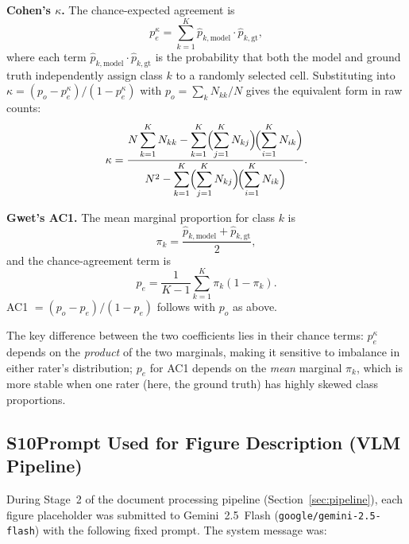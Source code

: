 \documentclass[../main.tex]{subfiles}
\begin{document}
\textbf{Cohen's $\kappa$.}
The chance-expected agreement is
\begin{equation*}
  p_e^\kappa = \sum_{k=1}^{K} \hat{p}_{k,\text{model}} \cdot \hat{p}_{k,\text{gt}},
\end{equation*}
where each term $\hat{p}_{k,\text{model}} \cdot \hat{p}_{k,\text{gt}}$ is the
probability that both the model and ground truth independently assign class $k$
to a randomly selected cell.
Substituting into $\kappa = (p_o - p_e^\kappa)/(1 - p_e^\kappa)$ with
$p_o = \sum_k N_{kk}/N$ gives the equivalent form in raw counts:
\begin{equation*}
  \kappa =
    \frac{N\displaystyle\sum_{k=1}^{K} N_{kk}
        - \displaystyle\sum_{k=1}^{K}
            \Bigl(\sum_{j=1}^{K} N_{kj}\Bigr)\!\Bigl(\sum_{i=1}^{K} N_{ik}\Bigr)}
         {N^2
        - \displaystyle\sum_{k=1}^{K}
            \Bigl(\sum_{j=1}^{K} N_{kj}\Bigr)\!\Bigl(\sum_{i=1}^{K} N_{ik}\Bigr)}.
\end{equation*}

\textbf{Gwet's AC1.}
The mean marginal proportion for class $k$ is
\begin{equation*}
  \pi_k = \frac{\hat{p}_{k,\text{model}} + \hat{p}_{k,\text{gt}}}{2},
\end{equation*}
and the chance-agreement term is
\begin{equation*}
  p_e = \frac{1}{K-1}\sum_{k=1}^{K} \pi_k(1 - \pi_k).
\end{equation*}
AC1 $= (p_o - p_e)/(1 - p_e)$ follows with $p_o$ as above.

The key difference between the two coefficients lies in their chance terms:
$p_e^\kappa$ depends on the \emph{product} of the two marginals, making it
sensitive to imbalance in either rater's distribution; $p_e$ for AC1 depends
on the \emph{mean} marginal $\pi_k$, which is more stable when one rater
(here, the ground truth) has highly skewed class proportions.

\subsection*{S10\quad Prompt Used for Figure Description (VLM Pipeline)}
\label{sec:si-vlm-prompt}

During Stage~2 of the document processing pipeline
(Section~\ref{sec:pipeline}), each figure placeholder was submitted to
Gemini~2.5~Flash (\texttt{google/gemini-2.5-flash}) with the following
fixed prompt.
The system message was:
\end{document}

